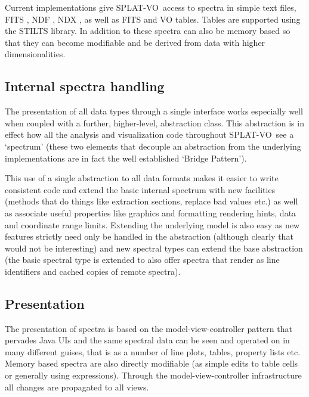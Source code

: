 \documentclass[final,authoryear,5p,times,twocolumn]{elsarticle}
\newcommand{\splatvo}{{\textsf{\small{SPLAT-VO}}}}
\newcommand{\ascl}[1]{\href{http://www.ascl.net/#1}{ascl:#1}}
\begin{document}
Current implementations give \splatvo\ access to spectra in simple text
files, FITS \citep{2010A&A...524A..42P}, NDF \citep{ndfjenness}, NDX
\citep{2003ASPC..295..221G}, as well as FITS and VO tables. Tables are
supported using the STILTS
\citep[][\ascl{1105.001}]{2006ASPC..351..666T} library. In addition to
these spectra can also be memory based so that they can become
modifiable and be derived from data with higher dimensionalities.

\subsection{Internal spectra handling}

The presentation of all data types through a single interface works especially
well when coupled with a further, higher-level, abstraction class. This
abstraction is in effect how all the analysis and visualization code
throughout \splatvo\ see a `spectrum' (these two elements that decouple an
abstraction from the underlying implementations are in fact the well
established `Bridge Pattern').

This use of a single abstraction to all data formats makes it easier to write
consistent code and extend the basic internal spectrum with new facilities
(methods that do things like extraction sections, replace bad values etc.) as
well as associate useful properties like graphics and formatting rendering
hints, data and coordinate range limits. Extending the underlying model is
also easy as new features strictly need only be handled in the abstraction
(although clearly that would not be interesting) and new spectral types can
extend the base abstraction (the basic spectral type is extended to also offer
spectra that render as line identifiers and cached copies of remote spectra).


\subsection{Presentation}

The presentation of spectra is based on the model-view-controller pattern that
pervades Java UIs and the same spectral data can be seen and operated on in
many different guises, that is as a number of line plots, tables, property
lists etc. Memory based spectra are also directly modifiable (as simple edits
to table cells or generally using expressions). Through the
model-view-controller infrastructure all changes are propagated to all views.
\end{document}
